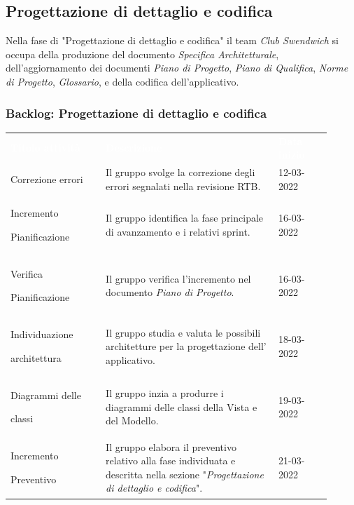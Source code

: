 \newpage
\subsection{Progettazione di dettaglio e codifica}
Nella fase di "Progettazione di dettaglio e codifica" il team \textit{Club Swendwich} si occupa della produzione del documento \textit{Specifica Architetturale}, dell'aggiornamento dei documenti \textit{Piano di Progetto}, \textit{Piano di Qualifica}, \textit{Norme di Progetto}, \textit{Glossario}, e della codifica dell'applicativo.

\subsubsection{Backlog: Progettazione di dettaglio e codifica}
{\renewcommand{\arraystretch}{1.5}
\begin{longtable}{p{0.27\linewidth}p{0.49\linewidth}p{0.15\linewidth}}
	\rowcolor[RGB]{33, 73, 50}
	\textcolor{white}{\textbf{Titolo attività}} & \textcolor{white}{\textbf{Descrizione}} & \textcolor{white}{\textbf{Data inizio}}\\

    \rowcolor[RGB]{216, 235, 171}
    Correzione errori & Il gruppo svolge la correzione degli errori segnalati nella revisione RTB. & 12-03-2022\\

    \rowcolor[RGB]{233, 245, 206}
    Incremento \par Pianificazione & Il gruppo identifica la fase principale di avanzamento e i relativi sprint. & 16-03-2022\\

    \rowcolor[RGB]{216, 235, 171} 
    Verifica \par Pianificazione & Il gruppo verifica l'incremento nel documento \textit{Piano di Progetto}. & 16-03-2022\\

    \rowcolor[RGB]{233, 245, 206}
    Individuazione \par architettura & Il gruppo studia e valuta le possibili architetture per la progettazione dell' applicativo. & 18-03-2022\\

    \rowcolor[RGB]{216, 235, 171}
    Diagrammi delle \par classi & Il gruppo inzia a produrre i diagrammi delle classi della Vista e del Modello. & 19-03-2022 \\

    \rowcolor[RGB]{233, 245, 206}
    Incremento \par Preventivo & Il gruppo elabora il preventivo relativo alla fase individuata e descritta nella sezione "\textit{Progettazione di dettaglio e codifica}". & 21-03-2022\\


\end{longtable}}
